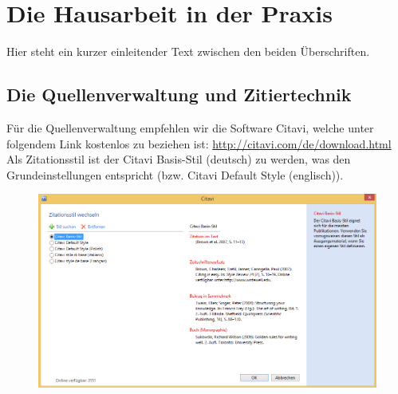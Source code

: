 \section{Die Hausarbeit in der Praxis}
\label{sec:kapitel2}




Hier steht ein kurzer einleitender Text zwischen den beiden Überschriften.



\subsection{Die Quellenverwaltung und Zitiertechnik}
Für die Quellenverwaltung empfehlen wir die Software Citavi, welche unter folgendem Link kostenlos zu beziehen ist: \underline{http://citavi.com/de/download.html}\\
Als Zitationsstil ist der Citavi Basis-Stil (deutsch) zu werden, was den Grundeinstellungen entspricht (bzw. Citavi Default Style (englisch)).
\begin{figure}[!htb]
\centering
\includegraphics[scale=0.45]{Bilder/Citavi.png}
\end{figure}

